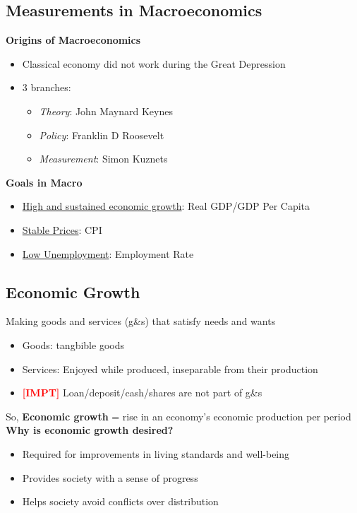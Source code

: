 \documentclass{article}
\newcommand{\impt}[0]{\textcolor{red}{\textbf{[IMPT] }}}
\begin{document}
\begin{multicols}{2}
\section{Measurements in Macroeconomics}
\textbf{Origins of Macroeconomics}
\begin{itemize}
	\item Classical economy did not work during the Great Depression
	\item 3 branches:
	\begin{itemize}
		\item \textit{Theory}: John Maynard Keynes
		\item \textit{Policy}: Franklin D Roosevelt
		\item \textit{Measurement}: Simon Kuznets
	\end{itemize}
\end{itemize}
\textbf{Goals in Macro}
\begin{itemize}
	\item \underline{High and sustained economic growth}: Real GDP/GDP Per Capita
	\item \underline{Stable Prices}: CPI
	\item \underline{Low Unemployment}: Employment Rate
\end{itemize}
\subsection{Economic Growth}
Making goods and services (g\&s) that satisfy needs and wants
\begin{itemize}
	\item Goods: tangbible goods
	\item Services: Enjoyed while produced, inseparable from their production
	\item \impt Loan/deposit/cash/shares are not part of g\&s
\end{itemize}
So, \textbf{Economic growth} = rise in an economy's economic production per period\\
\textbf{Why is economic growth desired?}
\begin{itemize}
	\item Required for improvements in living standards and well-being
	\item Provides society with a sense of progress
	\item Helps society avoid conflicts over distribution
\end{itemize}

\end{multicols}
\end{document}
